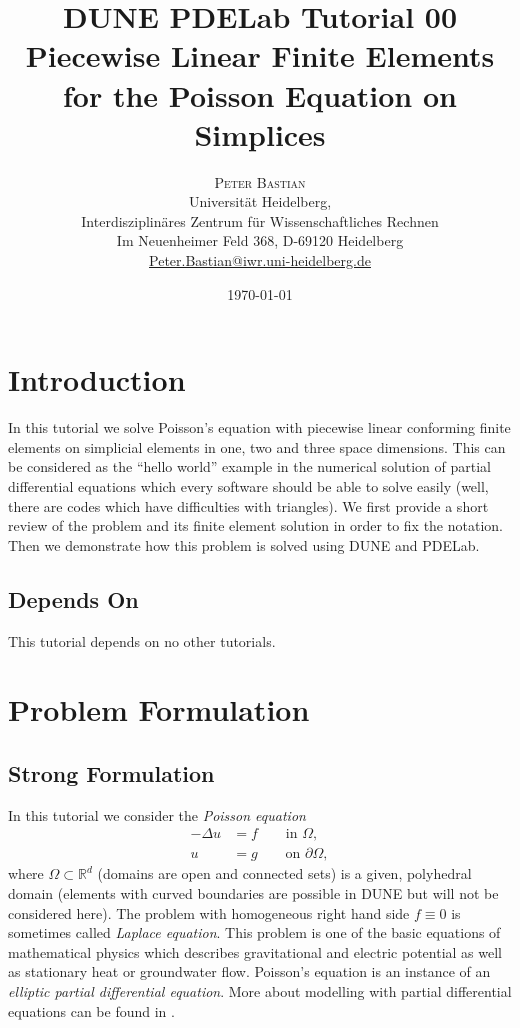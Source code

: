 \documentclass[a4paper,
		     11pt,
		     DIV12,
		     DIVcalc,
		     headings=normal,
		     oneside,
		     bibliography=totoc,
		     headsepline=false,
		     headinclude]{scrartcl}
\title{DUNE PDELab Tutorial 00 \\ 
Piecewise Linear Finite Elements for the Poisson Equation on Simplices}
\author{\textsc{Peter Bastian}\\
  Universität Heidelberg, \\
  Interdisziplinäres Zentrum für Wissenschaftliches Rechnen\\
  Im Neuenheimer Feld 368, D-69120 Heidelberg\\
  \url{Peter.Bastian@iwr.uni-heidelberg.de}
}
\date{\today}
\begin{document}
\maketitle
\tableofcontents
\clearpage

\section{Introduction}

In this tutorial we solve Poisson's equation with piecewise linear conforming 
finite elements on simplicial elements in one, two and three space dimensions. 
This can be considered as the ``hello world''
example in the numerical solution of partial differential equations which
every software should be able to solve easily (well, there are codes which have
difficulties with triangles). We first provide a short review of the problem and
its finite element solution in order to fix the notation. Then we demonstrate
how this problem is solved using DUNE and PDELab.

\subsection*{Depends On} This tutorial depends on no other tutorials.

\section{Problem Formulation}

\subsection{Strong Formulation}

In this tutorial we consider the {\em Poisson equation}
\begin{subequations}
\begin{align}
-\Delta u & = f \qquad\text{in $\Omega$},\label{eq:1a}\\
u &= g \qquad\text{on $\partial\Omega$},\label{eq:1b}
\end{align}
\end{subequations}
where $\Omega\subset\mathbb{R}^d$ (domains are open and connected sets)
is a given, polyhedral domain (elements with curved
boundaries are possible in DUNE but will not be considered here). 
The problem with homogeneous right hand side $f\equiv 0$ is sometimes called
{\em Laplace equation}. This problem 
is one of the basic equations of mathematical physics which describes gravitational
and electric potential as well as stationary heat or groundwater flow.
Poisson's equation is an instance of an {\em elliptic partial differential equation}.
More about modelling with partial differential equations can be found in \cite{Eriksson,BastianII}.
\end{document}
